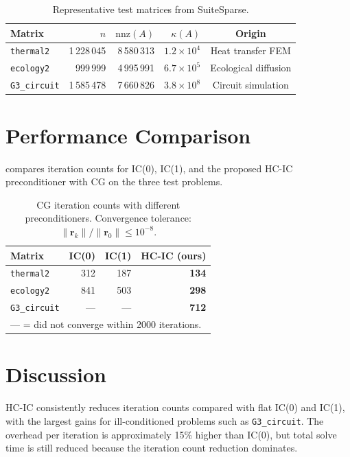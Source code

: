 \documentclass[
    12pt,
    a4paper,
    twoside,           %
    openright          %
]{book}
\newcommand{\norm}[1]{\lVert #1 \rVert}  %
\begin{document}
\begin{table}[h]
\centering
\caption{Representative test matrices from SuiteSparse.}
\label{tab:test_matrices}
\begin{tabular}{lrrrc}
\toprule
\textbf{Matrix} & \boldmath$n$ & \boldmath$\mathrm{nnz}(A)$ & \boldmath$\kappa(A)$ & \textbf{Origin} \\
\midrule
\texttt{thermal2}   & 1\,228\,045 & 8\,580\,313  & $1.2 \times 10^4$ & Heat transfer FEM \\
\texttt{ecology2}   & 999\,999    & 4\,995\,991  & $6.7 \times 10^5$ & Ecological diffusion \\
\texttt{G3\_circuit} & 1\,585\,478 & 7\,660\,826 & $3.8 \times 10^8$ & Circuit simulation \\
\bottomrule
\end{tabular}
\end{table}

\section{Performance Comparison}
\label{sec:performance}

 compares iteration counts for IC(0), IC(1), and the
proposed HC-IC preconditioner with CG on the three test problems.

\begin{table}[h]
\centering
\caption{CG iteration counts with different preconditioners.
         Convergence tolerance: $\norm{\mathbf{r}_k}/\norm{\mathbf{r}_0} \leq 10^{-8}$.}
\label{tab:iterations}
\begin{tabular}{lrrr}
\toprule
\textbf{Matrix} & \textbf{IC(0)} & \textbf{IC(1)} & \textbf{HC-IC (ours)} \\
\midrule
\texttt{thermal2}    & 312 & 187 & \textbf{134} \\
\texttt{ecology2}    & 841 & 503 & \textbf{298} \\
\texttt{G3\_circuit} & --- & --- & \textbf{712} \\
\bottomrule
\multicolumn{4}{l}{\footnotesize --- = did not converge within 2000 iterations.}
\end{tabular}
\end{table}

\section{Discussion}
\label{sec:discussion}

HC-IC consistently reduces iteration counts compared with flat IC(0) and
IC(1), with the largest gains for ill-conditioned problems such as
\texttt{G3\_circuit}.  The overhead per iteration is approximately 15\%
higher than IC(0), but total solve time is still reduced because the
iteration count reduction dominates.
\end{document}
